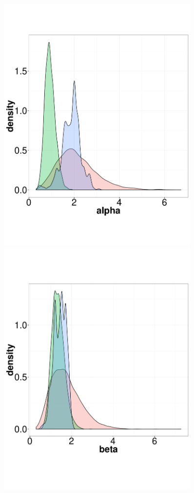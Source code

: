   \begin{figure}%
  \begin{minipage}[hp]{0.45\linewidth}
  \centering
    \includegraphics [width=0.90\textwidth, angle=0]{figs/dist_alpha.pdf}
    \vspace{-0 in}
  \end{minipage}
  \begin{minipage}[!hp]{0.45\linewidth}
  \centering
    \includegraphics [width=0.90\textwidth, angle=0]{figs/dist_beta.pdf}

\end{minipage}
\end{figure}
